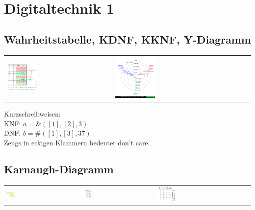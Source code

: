 \section{Digitaltechnik 1}
\subsection{Wahrheitstabelle, KDNF, KKNF, Y-Diagramm}
\begin{tabular}{ll}
  \includegraphics[width=0.3\textwidth]{pics/KNFDNF} & \includegraphics[width=0.3\textwidth]{pics/ydiagramm} \\
\end{tabular}
Kurzschreibweisen:\\
KNF: $ a = \&([1],[2],3) $ \\
DNF: $ b = \#([1],[3],37) $ \\
Zeugs in eckigen Klammern bedeutet don't care.
\subsection{Karnaugh-Diagramm}
\begin{tabular}{lll}
  \includegraphics[width=0.1\textwidth]{pics/kv/2erKV} & 
  \includegraphics[width=0.1\textwidth]{pics/kv/3erKV} &
  \includegraphics[width=0.2\textwidth]{pics/kv/4erKV}\\
\end{tabular}
